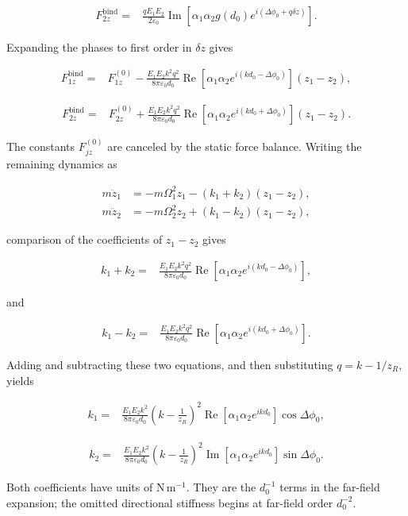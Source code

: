 \[
\begin{aligned}
F_{2z}^{\mathrm{bind}}
={}&\frac{qE_1E_2}{2\varepsilon_0}
\operatorname{Im}\!\left[
\alpha_1\alpha_2g(d_0)e^{i(\Delta\phi_0+q\delta z)}
\right].
\end{aligned}
\]

Expanding the phases to first order in \(\delta z\) gives

\[
\begin{aligned}
F_{1z}^{\mathrm{bind}}
={}&F_{1z}^{(0)}
-
\frac{E_1E_2k^2q^2}{8\pi\varepsilon_0d_0}
\operatorname{Re}\!\left[
\alpha_1\alpha_2e^{i(kd_0-\Delta\phi_0)}\right]
(z_1-z_2),
\end{aligned}
\]

\[
\begin{aligned}
F_{2z}^{\mathrm{bind}}
={}&F_{2z}^{(0)}
+
\frac{E_1E_2k^2q^2}{8\pi\varepsilon_0d_0}
\operatorname{Re}\!\left[
\alpha_1\alpha_2e^{i(kd_0+\Delta\phi_0)}\right]
(z_1-z_2).
\end{aligned}
\]

The constants \(F_{jz}^{(0)}\) are canceled by the static force balance.
Writing the remaining dynamics as

\[
\begin{aligned}
m\ddot z_1&=-m\Omega_1^2z_1-(k_1+k_2)(z_1-z_2),\\
m\ddot z_2&=-m\Omega_2^2z_2+(k_1-k_2)(z_1-z_2),
\end{aligned}
\]

comparison of the coefficients of \(z_1-z_2\) gives

\[
\begin{aligned}
k_1+k_2={}&
\frac{E_1E_2k^2q^2}{8\pi\varepsilon_0d_0}
\operatorname{Re}\!\left[
\alpha_1\alpha_2e^{i(kd_0-\Delta\phi_0)}\right],
\end{aligned}
\]

and

\[
\begin{aligned}
k_1-k_2={}&
\frac{E_1E_2k^2q^2}{8\pi\varepsilon_0d_0}
\operatorname{Re}\!\left[
\alpha_1\alpha_2e^{i(kd_0+\Delta\phi_0)}\right].
\end{aligned}
\]

Adding and subtracting these two equations, and then substituting
$q=k-1/z_R$, yields

\[
\boxed{\begin{aligned}
k_1={}&\frac{E_1E_2k^2}
{8\pi\varepsilon_0d_0}
\left(k-\frac{1}{z_R}\right)^2
\operatorname{Re}\!\left[
\alpha_1\alpha_2e^{ikd_0}\right]\cos\Delta\phi_0,
\end{aligned}}
\]

\[
\boxed{\begin{aligned}
k_2={}&\frac{E_1E_2k^2}
{8\pi\varepsilon_0d_0}
\left(k-\frac{1}{z_R}\right)^2
\operatorname{Im}\!\left[
\alpha_1\alpha_2e^{ikd_0}\right]\sin\Delta\phi_0.
\end{aligned}}
\]

Both coefficients have units of \(\mathrm{N\,m^{-1}}\).  They are the
\(d_0^{-1}\) terms in the far-field expansion; the omitted directional
stiffness begins at far-field order \(d_0^{-2}\).
